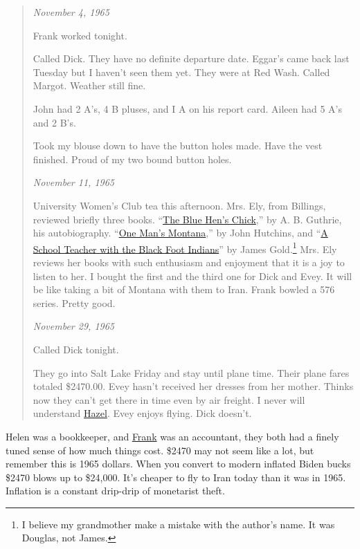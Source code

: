 \begin{quote}
\emph{November 4, 1965}

Frank worked tonight.

Called Dick. They have no definite departure date. Eggar's came back
last Tuesday but I haven't seen them yet. They were at Red Wash. Called
Margot. Weather still fine.

John had 2 A's, 4 B pluses, and I A on his report card. Aileen had 5 A's
and 2 B's.

Took my blouse down to have the button holes made. Have the vest
finished. Proud of my two bound button holes.

\emph{November 11, 1965}

University Women's Club tea this afternoon. Mrs. Ely, from Billings,
reviewed briefly three books.
``\href{https://www.amazon.com/Blue-Hens-Chick-Autobiography/dp/0803270380}{The
Blue Hen's Chick},'' by A. B. Guthrie, his autobiography.
``\href{https://www.amazon.com/One-Mans-Montana-Informal-Portrait/dp/B003L1SKGQ}{One
Man's Montana},'' by John Hutchins, and
``\href{https://www.amazon.com/Schoolmaster-Blackfeet-Indians-Douglas-Gold/dp/B0007HGHW6}{A
School Teacher with the Black Foot Indians}'' by James
Gold.\footnote{  I believe my grandmother make a mistake with the author's name. It was
  Douglas, not James.} Mrs. Ely reviews her books with such enthusiasm and enjoyment that it is
a joy to listen to her. I bought the first and the third one for Dick
and Evey. It will be like taking a bit of Montana with them to Iran.
Frank bowled a 576 series. Pretty good.

\emph{November 29, 1965}

Called Dick tonight.

They go into Salt Lake Friday and stay until plane time. Their plane
fares totaled \$2470.00. Evey hasn't received her dresses from her
mother. Thinks now they can't get there in time even by air freight. I
never will understand \href{https://conceptcontrol.smugmug.com/People/Grandparents-1/i-PBjmr7p/A}{Hazel}. Evey enjoys flying. Dick doesn't.
\end{quote}

Helen was a bookkeeper, and \href{https://conceptcontrol.smugmug.com/People/Grandparents-1/i-2fPXg4d/A}{Frank} was an accountant, they both had a
finely tuned sense of how much things cost. \$2470 may not seem like a
lot, but remember this is 1965 dollars. When you convert to modern
inflated Biden bucks \$2470 blows up to \$24,000. It's cheaper to fly to
Iran today than it was in 1965. Inflation is a constant drip-drip of
monetarist theft.

